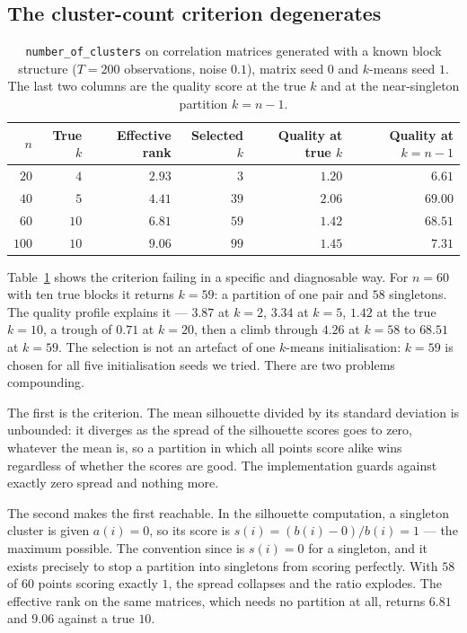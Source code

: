 \documentclass[11pt,a4paper]{article}
\newcommand{\code}[1]{\texttt{#1}}
\begin{document}
\subsection{The cluster-count criterion degenerates}

\begin{table}[t]
\centering
\caption{\code{number\_of\_clusters} on correlation matrices generated with a
known block structure ($T = 200$ observations, noise $0.1$), matrix seed $0$
and $k$-means seed $1$. The last two columns are the quality score at the true
$k$ and at the near-singleton partition $k = n - 1$.}
\label{tab:clusters}
\begin{tabular}{rrrrrr}
\toprule
$n$ & True $k$ & Effective rank & Selected $k$ & Quality at true $k$ & Quality at $k = n-1$ \\
\midrule
$20$  & $4$  & $2.93$ & $3$  & $1.20$ & $6.61$  \\
$40$  & $5$  & $4.41$ & $39$ & $2.06$ & $69.00$ \\
$60$  & $10$ & $6.81$ & $59$ & $1.42$ & $68.51$ \\
$100$ & $10$ & $9.06$ & $99$ & $1.45$ & $7.31$  \\
\bottomrule
\end{tabular}
\end{table}

Table~\ref{tab:clusters} shows the criterion failing in a specific and
diagnosable way. For $n = 60$ with ten true blocks it returns $k = 59$: a
partition of one pair and $58$ singletons. The quality profile explains it ---
$3.87$ at $k = 2$, $3.34$ at $k = 5$, $1.42$ at the true $k = 10$, a trough of
$0.71$ at $k = 20$, then a climb through $4.26$ at $k = 58$ to $68.51$ at
$k = 59$. The selection is not an artefact of one $k$-means initialisation:
$k = 59$ is chosen for all five initialisation seeds we tried. There are two
problems compounding.

The first is the criterion. The mean silhouette divided by its standard
deviation is unbounded: it diverges as the spread of the silhouette scores
goes to zero, whatever the mean is, so a partition in which all points score
alike wins regardless of whether the scores are good. The implementation
guards against exactly zero spread and nothing more.

The second makes the first reachable. In the silhouette computation, a
singleton cluster is given $a(i) = 0$, so its score is
$s(i) = (b(i) - 0)/b(i) = 1$ --- the maximum possible. The convention since
\citet{rousseeuw1987} is $s(i) = 0$ for a singleton, and it exists precisely
to stop a partition into singletons from scoring perfectly. With $58$ of $60$
points scoring exactly $1$, the spread collapses and the ratio explodes. The
effective rank on the same matrices, which needs no partition at all, returns
$6.81$ and $9.06$ against a true $10$.
\end{document}
